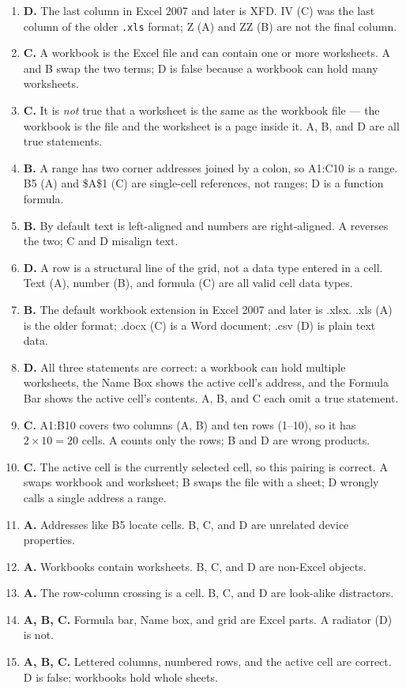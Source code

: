 \documentclass[11pt]{article}
\begin{document}
\begin{enumerate}[label=\textbf{Q\arabic*.}, leftmargin=*]
  \texttt{.xls} limit; 1,048,576 (D) is the row count.
\item \textbf{D.} The last column in Excel 2007 and later is XFD. IV (C) was
  the last column of the older \texttt{.xls} format; Z (A) and ZZ (B) are not
  the final column.
\item \textbf{C.} A workbook is the Excel file and can contain one or more
  worksheets. A and B swap the two terms; D is false because a workbook can
  hold many worksheets.
\item \textbf{C.} It is \emph{not} true that a worksheet is the same as the
  workbook file --- the workbook is the file and the worksheet is a page
  inside it. A, B, and D are all true statements.
\item \textbf{B.} A range has two corner addresses joined by a colon, so
  A1:C10 is a range. B5 (A) and \$A\$1 (C) are single-cell references, not
  ranges; D is a function formula.
\item \textbf{B.} By default text is left-aligned and numbers are
  right-aligned. A reverses the two; C and D misalign text.
\item \textbf{D.} A row is a structural line of the grid, not a data type
  entered in a cell. Text (A), number (B), and formula (C) are all valid
  cell data types.
\item \textbf{B.} The default workbook extension in Excel 2007 and later is
  .xlsx. .xls (A) is the older format; .docx (C) is a Word document; .csv (D)
  is plain text data.
\item \textbf{D.} All three statements are correct: a workbook can hold
  multiple worksheets, the Name Box shows the active cell's address, and the
  Formula Bar shows the active cell's contents. A, B, and C each omit a true
  statement.
\item \textbf{C.} A1:B10 covers two columns (A, B) and ten rows (1--10), so it
  has $2 \times 10 = 20$ cells. A counts only the rows; B and D are wrong
  products.
\item \textbf{C.} The active cell is the currently selected cell, so this
  pairing is correct. A swaps workbook and worksheet; B swaps the file with a
  sheet; D wrongly calls a single address a range.

\item \textbf{A.} Addresses like B5 locate cells. B, C, and D are unrelated device properties.
\item \textbf{A.} Workbooks contain worksheets. B, C, and D are non-Excel objects.
\item \textbf{A.} The row-column crossing is a cell. B, C, and D are look-alike distractors.
\item \textbf{A, B, C.} Formula bar, Name box, and grid are Excel parts. A radiator (D) is not.
\item \textbf{A, B, C.} Lettered columns, numbered rows, and the active cell are correct. D is false: workbooks hold whole sheets.
\end{enumerate}
\def\JKSSBLessonID{24}\def\JKSSBAnswers{1}
\end{document}
